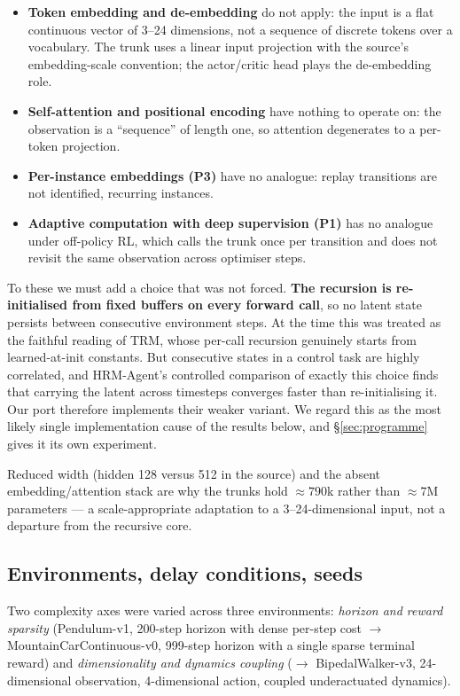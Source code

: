 \documentclass[11pt]{article}
\begin{document}
\begin{itemize}
  \item \textbf{Token embedding and de-embedding} do not apply: the input is a flat continuous vector of 3--24 dimensions, not a sequence of discrete tokens over a vocabulary. The trunk uses a linear input projection with the source's embedding-scale convention; the actor/critic head plays the de-embedding role.
  \item \textbf{Self-attention and positional encoding} have nothing to operate on: the observation is a ``sequence'' of length one, so attention degenerates to a per-token projection.
  \item \textbf{Per-instance embeddings (P3)} have no analogue: replay transitions are not identified, recurring instances.
  \item \textbf{Adaptive computation with deep supervision (P1)} has no analogue under off-policy RL, which calls the trunk once per transition and does not revisit the same observation across optimiser steps.
\end{itemize}

To these we must add a choice that was not forced. \textbf{The recursion is re-initialised from fixed buffers on every forward call}, so no latent state persists between consecutive environment steps. At the time this was treated as the faithful reading of TRM, whose per-call recursion genuinely starts from learned-at-init constants. But consecutive states in a control task are highly correlated, and HRM-Agent's controlled comparison of exactly this choice \citep{dang2025hrmagent} finds that carrying the latent across timesteps converges faster than re-initialising it. Our port therefore implements their weaker variant. We regard this as the most likely single implementation cause of the results below, and \S\ref{sec:programme} gives it its own experiment.

Reduced width (hidden 128 versus 512 in the source) and the absent embedding/attention stack are why the trunks hold ${\approx}790$k rather than ${\approx}7$M parameters --- a scale-appropriate adaptation to a 3--24-dimensional input, not a departure from the recursive core.

\subsection{Environments, delay conditions, seeds}

Two complexity axes were varied across three environments: \emph{horizon and reward sparsity} (Pendulum-v1, 200-step horizon with dense per-step cost $\to$ MountainCarContinuous-v0, 999-step horizon with a single sparse terminal reward) and \emph{dimensionality and dynamics coupling} ($\to$ BipedalWalker-v3, 24-dimensional observation, 4-dimensional action, coupled underactuated dynamics).
\end{document}
